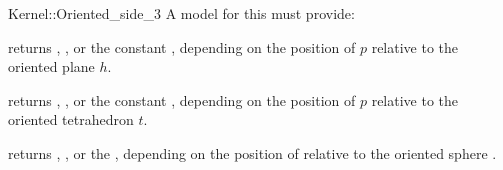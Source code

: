 \begin{ccRefFunctionObjectConcept}{Kernel::Oriented_side_3}
A model for this must provide:


{returns ,
, or the constant ,
depending on the position of $p$  relative to the oriented plane $h$.}

{returns ,
, or the constant ,
depending on the position of $p$  relative to the oriented tetrahedron $t$.}

{returns ,
, or the ,
depending on the position of   relative to the oriented sphere .}

\end{ccRefFunctionObjectConcept}
